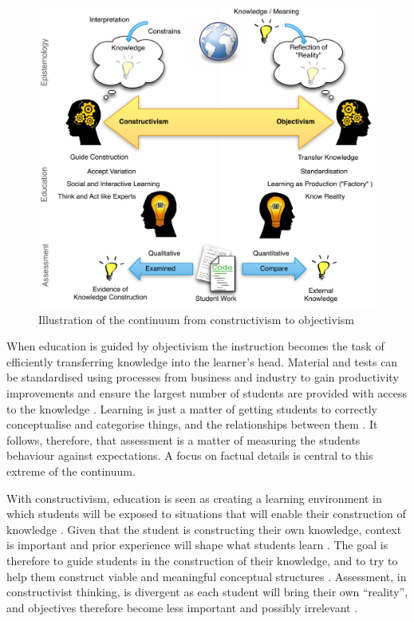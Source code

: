 \begin{figure}[htpb]
	\centering 
	\includegraphics[width=\columnwidth]{ConstructivismObjectivism}
	\caption{Illustration of the continuum from constructivism to objectivism}
	\label{fig:const_obj}
\end{figure}

When education is guided by objectivism the instruction becomes the task of efficiently transferring knowledge into the learner's head. Material and tests can be standardised using processes from business and industry to gain productivity improvements and ensure the largest number of students are provided with access to the knowledge \cite{Tyler:1969,Vrasidas:2000}. Learning is just a matter of getting students to correctly conceptualise and categorise things, and the relationships between them \cite{Lakoff:1987}. It follows, therefore, that assessment is a matter of measuring the students behaviour against expectations. A focus on factual details is central to this extreme of the continuum. 

With constructivism, education is seen as creating a learning environment in which students will be exposed to situations that will enable their construction of knowledge \cite{Jonassen:1991,Vrasidas:2000}. Given that the student is constructing their own knowledge, context is important and prior experience will shape what students learn \cite{Jonassen:1991a}. The goal is therefore to guide students in the construction of their knowledge, and to try to help them construct viable and meaningful conceptual structures \cite{Jonassen:1991,Vrasidas:2000}. Assessment, in constructivist thinking, is divergent as each student will bring their own ``reality'', and objectives therefore become less important and possibly irrelevant \cite{Jonassen:1992}. 

